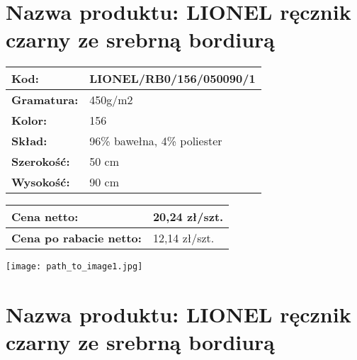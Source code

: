 \documentclass[a4paper,10pt]{article}
\begin{document}
\section*{Nazwa produktu: LIONEL ręcznik czarny ze srebrną bordiurą}

\begin{minipage}{0.5\textwidth}
  \begin{tabular}{|l|l|}
    \hline
    \textbf{Kod:} & LIONEL/RB0/156/050090/1 \\ \hline
    \textbf{Gramatura:} & 450g/m2 \\ \hline
    \textbf{Kolor:} & 156 \\ \hline
    \textbf{Skład:} & 96\% bawełna, 4\% poliester \\ \hline
    \textbf{Szerokość:} & 50 cm \\ \hline
    \textbf{Wysokość:} & 90 cm \\ \hline
  \end{tabular}
  \vspace{0.5cm}
  \begin{tabular}{|l|l|}
    \hline
    \textbf{Cena netto:} & 20,24 zł/szt. \\ \hline
    \textbf{Cena po rabacie netto:} & 12,14 zł/szt. \\ \hline
  \end{tabular}
\end{minipage}
\begin{minipage}{0.5\textwidth}
  \centering
  \texttt{[image: path\_to\_image1.jpg]} %
\end{minipage}

\newpage

\section*{Nazwa produktu: LIONEL ręcznik czarny ze srebrną bordiurą}
\end{document}
